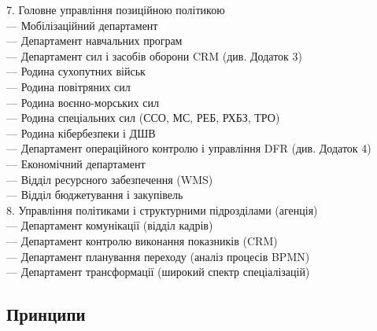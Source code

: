 7. Головне управління позиційною політикою \\
\hspace{2cm}     — Мобілізаційний департамент \\
\hspace{2cm}     — Департамент навчальних програм \\
\hspace{2cm}     — Департамент сил і засобів оборони CRM (див. Додаток 3) \\
\hspace{4cm}         — Родина сухопутних військ \\
\hspace{4cm}         — Родина повітряних сил \\
\hspace{4cm}         — Родина воєнно-морських сил \\
\hspace{4cm}         — Родина спеціальних сил (ССО, МС, РЕБ, РХБЗ, ТРО) \\
\hspace{4cm}         — Родина кібербезпеки і ДШВ \\
\hspace{2cm}     — Департамент операційного контролю і управління DFR (див. Додаток 4) \\
\hspace{2cm}     — Економічний департамент \\
\hspace{4cm}         — Відділ ресурсного забезпечення (WMS) \\
\hspace{4cm}         — Відділ бюджетування і закупівель \\
8. Управління політиками і структурними підрозділами (агенція) \\
\hspace{2cm}     — Департамент комунікації (відділ кадрів) \\
\hspace{2cm}     — Департамент контролю виконання показників (CRM) \\
\hspace{2cm}     — Департамент планування переходу (аналіз процесів BPMN) \\
\hspace{2cm}     — Департамент трансформації (широкий спектр спеціалізацій) \\

\subsection{Принципи}

